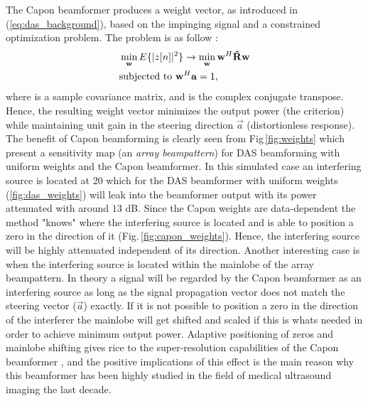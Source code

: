 The Capon beamformer produces a weight vector, as introduced in (\ref{eq:das_background}), based on the impinging signal and a constrained optimization problem. The problem is as follow \cite{Capon1969}:
\begin{align}
&\min_{\mathbf{w}} E\{|z[n]|^2\} \rightarrow \min_{\mathbf{w}} \mathbf{w}^H \mathbf{\hat{R}} \mathbf{w} \label{eq:capon_optimization_criteria_background} \\
&\text{subjected to } \mathbf{w}^H\mathbf{a} = 1,
\end{align}
where  is a sample covariance matrix, and  is the complex conjugate transpose. Hence, the resulting weight vector minimizes the output power (the criterion) while maintaining unit gain in the steering direction $\vec{a}$ (distortionless response). The benefit of Capon beamforming is clearly seen from Fig\,\ref{fig:weights} which present a sensitivity map (an \textit{array beampattern}) for DAS beamforming with uniform weights and the Capon beamformer. In this simulated case an interfering source is located at 20\degree{} which for the DAS beamformer with uniform weights (\ref{fig:das_weights}) will leak into the beamformer output with its power attenuated with around $13$ dB. Since the Capon weights are data-dependent the method "knows" where the interfering source is located and is able to position a zero in the direction of it (Fig.\,\ref{fig:capon_weights}). Hence, the interfering source will be highly attenuated independent of its direction. Another interesting case is when the interfering source is located within the mainlobe of the array beampattern. In theory a signal will be regarded by the Capon beamformer as an interfering source as long as the signal propagation vector does not match the steering vector ($\vec{a}$) exactly. If it is not possible to position a zero in the direction of the interferer the mainlobe will get shifted and scaled if this is whats needed in order to achieve minimum output power. Adaptive positioning of zeros and mainlobe shifting gives rice to the super-resolution capabilities of the Capon beamformer \cite{Synnevag2007}, and the positive implications of this effect \cite{Synnevag2009} is the main reason why this beamformer has been highly studied in the field of medical ultrasound imaging the last decade.

